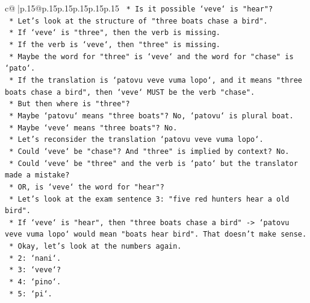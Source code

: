 \documentclass{article}
\begin{document}
{\begin{supertabular}{c@{$\;$}|p{.15\linewidth}@{}p{.15\linewidth}p{.15\linewidth}p{.15\linewidth}p{.15\linewidth}p{.15\linewidth}}
{{{\texttt{                        *   Is it possible `veve` is "hear"?} \\
\texttt{                        *   Let's look at the structure of "three boats chase a bird".} \\
\texttt{                        *   If `veve` is "three", then the verb is missing.} \\
\texttt{                        *   If the verb is `veve`, then "three" is missing.} \\
\texttt{                        *   Maybe the word for "three" is `veve` and the word for "chase" is `pato`.} \\
\texttt{                        *   If the translation is `patovu veve vuma lopo`, and it means "three boats chase a bird", then `veve` MUST be the verb "chase".} \\
\texttt{                        *   But then where is "three"?} \\
\texttt{                        *   Maybe `patovu` means "three boats"? No, `patovu` is plural boat.} \\
\texttt{                        *   Maybe `veve` means "three boats"? No.} \\
\texttt{                        *   Let's reconsider the translation `patovu veve vuma lopo`.} \\
\texttt{                        *   Could `veve` be "chase"? And "three" is implied by context? No.} \\
\texttt{                        *   Could `veve` be "three" and the verb is `pato` but the translator made a mistake?} \\
\texttt{                        *   OR, is `veve` the word for "hear"?} \\
\texttt{                        *   Let's look at the exam sentence 3: "five red hunters hear a old bird".} \\
\texttt{                        *   If `veve` is "hear", then "three boats chase a bird" {-}> `patovu veve vuma lopo` would mean "boats hear bird". That doesn't make sense.} \\
\texttt{                        *   Okay, let's look at the numbers again.} \\
\texttt{                        *   2: `nani`.} \\
\texttt{                        *   3: `veve`?} \\
\texttt{                        *   4: `pino`.} \\
\texttt{                        *   5: `pi`.} \\
}}}
\end{supertabular}}
\end{document}
